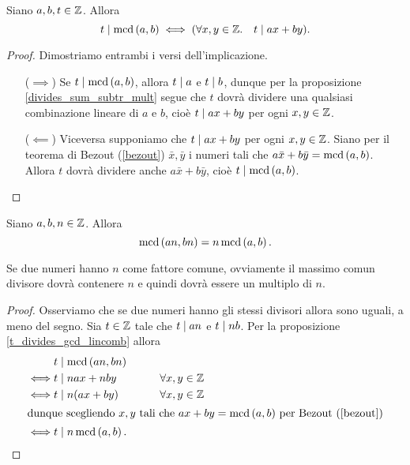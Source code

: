\begin{proposition} \label{t_divides_gcd_lincomb}
    Siano $a, b, t \in \mathbb{Z}$. Allora 
    \begin{equation}
        t \mid \operatorname{mcd}\left(a, b\right) \iff (\forall x, y \in \mathbb{Z}. \quad t \mid ax + by).
    \end{equation}
\end{proposition}
\begin{proof}
    Dimostriamo entrambi i versi dell'implicazione.
    \begin{itemize}
        \item[($\implies$)] Se $t \mid \operatorname{mcd}\left(a, b\right)$, allora $t \mid a$ e $t \mid b$, dunque per la proposizione \ref{divides_sum_subtr_mult} segue che $t$ dovrà dividere una qualsiasi combinazione lineare di $a$ e $b$, cioè $t \mid ax+by$ per ogni $x, y \in \mathbb{Z}$.
        \item[($\impliedby$)] Viceversa supponiamo che $t \mid ax+by$ per ogni $x, y \in \mathbb{Z}$. Siano per il teorema di Bezout (\ref{bezout}) $\bar{x}, \bar{y}$ i numeri tali che $a\bar{x} + b\bar{y} = \operatorname{mcd}\left(a, b\right)$. Allora $t$ dovrà dividere anche $a\bar{x} + b\bar{y}$, cioè $t \mid \operatorname{mcd}\left(a, b\right)$. \qedhere
    \end{itemize}
\end{proof}

\begin{proposition} \label{mcd_of_multiples_of_n}
    Siano $a, b, n \in \mathbb{Z}$. Allora \begin{equation}
        \operatorname{mcd}\left(an, bn\right) = n\operatorname{mcd}\left(a, b\right).
    \end{equation}
\end{proposition}
\begin{intuition}
    Se due numeri hanno $n$ come fattore comune, ovviamente il massimo comun divisore dovrà contenere $n$ e quindi dovrà essere un multiplo di $n$.
\end{intuition}
\begin{proof}
    Osserviamo che se due numeri hanno gli stessi divisori allora sono uguali, a meno del segno.
    Sia $t \in \mathbb{Z}$ tale che $t \mid an$ e $t \mid nb$. Per la proposizione \ref{t_divides_gcd_lincomb} allora 
    \begin{alignat*}
        {2}
        &t \mid \operatorname{mcd}\left(an, bn\right)\\
        \iff &t \mid nax + nby      \qquad& \forall x, y \in \mathbb{Z} \\
        \iff &t \mid n(ax + by)     \qquad& \forall x, y \in \mathbb{Z} \\
        \intertext{dunque scegliendo $x, y$ tali che $ax+by = \operatorname{mcd}\left(a, b\right)$ per Bezout (\ref{bezout})}
        \iff &t \mid n\operatorname{mcd}\left(a, b\right). \tag*{\qedhere}
    \end{alignat*}
\end{proof}



